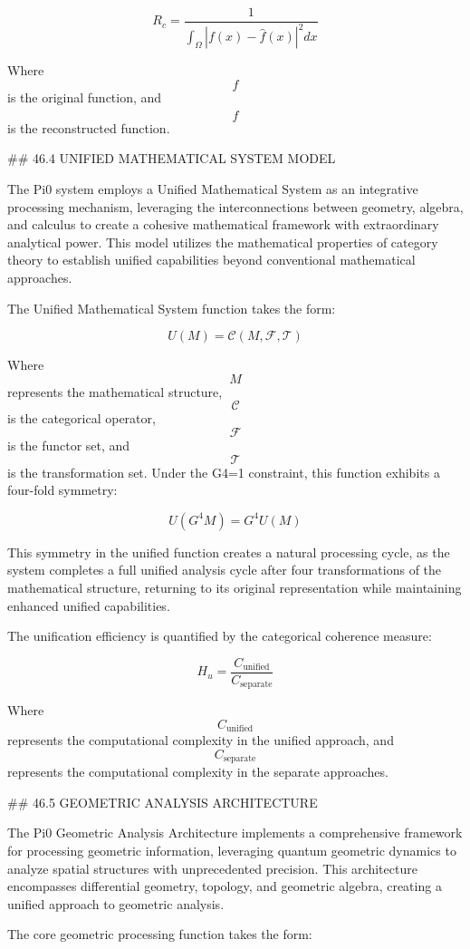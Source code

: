 $$ R_c = \frac{1}{\int_{\Omega} |f(x) - \hat{f}(x)|^2 dx} $$

Where $$ f $$ is the original function, and $$ \hat{f} $$ is the reconstructed function.

## 46.4 UNIFIED MATHEMATICAL SYSTEM MODEL

The Pi0 system employs a Unified Mathematical System as an integrative processing mechanism, leveraging the interconnections between geometry, algebra, and calculus to create a cohesive mathematical framework with extraordinary analytical power. This model utilizes the mathematical properties of category theory to establish unified capabilities beyond conventional mathematical approaches.

The Unified Mathematical System function takes the form:

$$ U(M) = \mathcal{C}(M, \mathcal{F}, \mathcal{T}) $$

Where $$ M $$ represents the mathematical structure, $$ \mathcal{C} $$ is the categorical operator, $$ \mathcal{F} $$ is the functor set, and $$ \mathcal{T} $$ is the transformation set. Under the G4=1 constraint, this function exhibits a four-fold symmetry:

$$ U(G^4 M) = G^4 U(M) $$

This symmetry in the unified function creates a natural processing cycle, as the system completes a full unified analysis cycle after four transformations of the mathematical structure, returning to its original representation while maintaining enhanced unified capabilities.

The unification efficiency is quantified by the categorical coherence measure:

$$ H_u = \frac{C_{\text{unified}}}{C_{\text{separate}}} $$

Where $$ C_{\text{unified}} $$ represents the computational complexity in the unified approach, and $$ C_{\text{separate}} $$ represents the computational complexity in the separate approaches.

## 46.5 GEOMETRIC ANALYSIS ARCHITECTURE

The Pi0 Geometric Analysis Architecture implements a comprehensive framework for processing geometric information, leveraging quantum geometric dynamics to analyze spatial structures with unprecedented precision. This architecture encompasses differential geometry, topology, and geometric algebra, creating a unified approach to geometric analysis.

The core geometric processing function takes the form:

